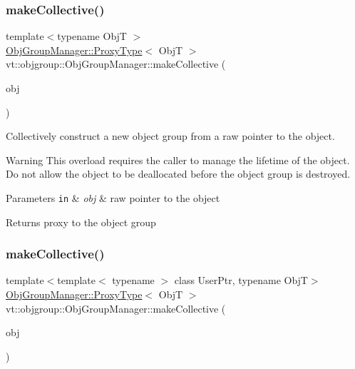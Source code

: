 \subsubsection{\texorpdfstring{make\+Collective()}{makeCollective()}\hspace{0.1cm}{\footnotesize\ttfamily [4/5]}}
{\footnotesize\ttfamily template$<$typename ObjT $>$ \\
\hyperlink{structvt_1_1objgroup_1_1_obj_group_manager_aea65eef52f240a52210132eef5ce591f}{Obj\+Group\+Manager\+::\+Proxy\+Type}$<$ ObjT $>$ vt\+::objgroup\+::\+Obj\+Group\+Manager\+::make\+Collective (\begin{DoxyParamCaption}\item[{ObjT $\ast$}]{obj }\end{DoxyParamCaption})}



Collectively construct a new object group from a raw pointer to the object. 

\begin{DoxyWarning}{Warning}
This overload requires the caller to manage the lifetime of the object. Do not allow the object to be deallocated before the object group is destroyed.
\end{DoxyWarning}

\begin{DoxyParams}[1]{Parameters}
\mbox{\tt in}  & {\em obj} & raw pointer to the object\\
\hline
\end{DoxyParams}
\begin{DoxyReturn}{Returns}
proxy to the object group 
\end{DoxyReturn}
\mbox{\label{structvt_1_1objgroup_1_1_obj_group_manager_affb52495aa20a14b485ad3ba48234718}} 
\subsubsection{\texorpdfstring{make\+Collective()}{makeCollective()}\hspace{0.1cm}{\footnotesize\ttfamily [5/5]}}
{\footnotesize\ttfamily template$<$template$<$ typename $>$ class User\+Ptr, typename ObjT$>$ \\
\hyperlink{structvt_1_1objgroup_1_1_obj_group_manager_aea65eef52f240a52210132eef5ce591f}{Obj\+Group\+Manager\+::\+Proxy\+Type}$<$ ObjT $>$ vt\+::objgroup\+::\+Obj\+Group\+Manager\+::make\+Collective (\begin{DoxyParamCaption}\item[{User\+Ptr$<$ ObjT $>$}]{obj }\end{DoxyParamCaption})}



